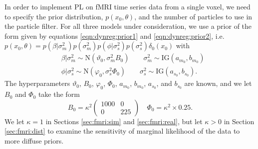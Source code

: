 In order to implement PL on fMRI time series data from a single voxel, we need to specify the prior distribution, $p(x_0,\theta)$, and the number of particles to use in the particle filter. For all three models under consideration, we use a prior of the form given by equations \eqref{eqn:dynreg:prior1} and \eqref{eqn:dynreg:prior2}, i.e. $p(x_0, \theta) = p(\beta|\sigma^2_m)p(\sigma^2_m)p(\phi|\sigma^2_s)p(\sigma^2_s)\delta_0(x_0)$ with
\begin{align}
&\beta|\sigma^2_m \sim \mbox{N}(\vartheta_0, \sigma^2_mB_0) \qquad \sigma^2_m \sim \mbox{IG}(a_{m_0}, b_{m_0}) \label{eqn:fmri:pl:prior1} \\
&\phi|\sigma^2_s \sim \mbox{N}(\varphi_0, \sigma^2_s\Phi_0) \qquad \sigma^2_s \sim \mbox{IG}(a_{s_0}, b_{s_0}). \label{eqn:fmri:pl:prior2}
\end{align}
The hyperparameters $\vartheta_0$, $B_0$, $\varphi_0$, $\Phi_0$, $a_{m_0}$, $b_{m_0}$, $a_{s_0}$, and $b_{s_0}$ are known, and we let $B_0$ and $\Phi_0$ take the form
\begin{equation}
B_0 = \kappa^2 \left(\begin{array}{cc} 1000 & 0 \\ 0 & 225 \end{array}\right) \quad \Phi_0 = \kappa^2\times0.25. \label{eqn:fmri:kappa}
\end{equation}
We let $\kappa = 1$ in Sections \ref{sec:fmri:sim} and \ref{sec:fmri:real}, but let $\kappa > 0$ in Section \ref{sec:fmri:dist} to examine the sensitivity of marginal likelihood of the data to more diffuse priors.

